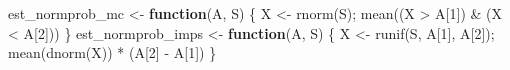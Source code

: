 \documentclass[
  letterpaper,
  DIV=11,
  numbers=noendperiod]{scrreprt}
\newenvironment{Shaded}{\begin{snugshade}}{\end{snugshade}}
\newcommand{\ControlFlowTok}[1]{\textcolor[rgb]{0.00,0.23,0.31}{\textbf{#1}}}
\newcommand{\DecValTok}[1]{\textcolor[rgb]{0.68,0.00,0.00}{#1}}
\newcommand{\FunctionTok}[1]{\textcolor[rgb]{0.28,0.35,0.67}{#1}}
\newcommand{\NormalTok}[1]{\textcolor[rgb]{0.00,0.23,0.31}{#1}}
\newcommand{\OtherTok}[1]{\textcolor[rgb]{0.00,0.23,0.31}{#1}}
\newcommand{\SpecialCharTok}[1]{\textcolor[rgb]{0.37,0.37,0.37}{#1}}
\begin{document}
\begin{Shaded}
\begin{Highlighting}[]
\NormalTok{est\_normprob\_mc   }\OtherTok{\textless{}{-}} \ControlFlowTok{function}\NormalTok{(A, S) \{ X }\OtherTok{\textless{}{-}} \FunctionTok{rnorm}\NormalTok{(S); }\FunctionTok{mean}\NormalTok{((X }\SpecialCharTok{\textgreater{}}\NormalTok{ A[}\DecValTok{1}\NormalTok{]) }\SpecialCharTok{\&}\NormalTok{ (X }\SpecialCharTok{\textless{}}\NormalTok{ A[}\DecValTok{2}\NormalTok{])) \}}
\NormalTok{est\_normprob\_imps }\OtherTok{\textless{}{-}} \ControlFlowTok{function}\NormalTok{(A, S) \{ X }\OtherTok{\textless{}{-}} \FunctionTok{runif}\NormalTok{(S, A[}\DecValTok{1}\NormalTok{], A[}\DecValTok{2}\NormalTok{]); }\FunctionTok{mean}\NormalTok{(}\FunctionTok{dnorm}\NormalTok{(X)) }\SpecialCharTok{*}\NormalTok{ (A[}\DecValTok{2}\NormalTok{] }\SpecialCharTok{{-}}\NormalTok{ A[}\DecValTok{1}\NormalTok{]) \}}


\end{Highlighting}
\end{Shaded}
\end{document}
